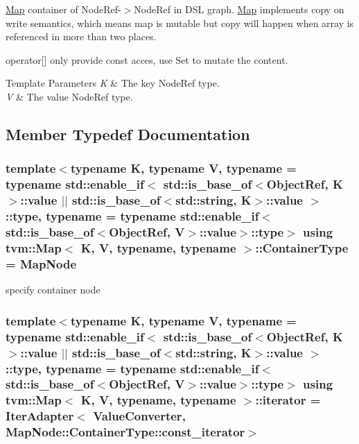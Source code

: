 \hyperlink{classtvm_1_1Map}{Map} container of Node\+Ref-\/$>$Node\+Ref in D\+SL graph. \hyperlink{classtvm_1_1Map}{Map} implements copy on write semantics, which means map is mutable but copy will happen when array is referenced in more than two places. 

operator\mbox{[}\mbox{]} only provide const acces, use Set to mutate the content. 
\begin{DoxyTemplParams}{Template Parameters}
{\em K} & The key Node\+Ref type. \\
\hline
{\em V} & The value Node\+Ref type. \\
\hline
\end{DoxyTemplParams}


\subsection{Member Typedef Documentation}
\subsubsection[{\texorpdfstring{Container\+Type}{ContainerType}}]{\setlength{\rightskip}{0pt plus 5cm}template$<$typename K, typename V, typename  = typename std\+::enable\+\_\+if$<$           std\+::is\+\_\+base\+\_\+of$<$\+Object\+Ref, K$>$\+::value $\vert$$\vert$           std\+::is\+\_\+base\+\_\+of$<$std\+::string, K$>$\+::value $>$\+::type, typename  = typename std\+::enable\+\_\+if$<$std\+::is\+\_\+base\+\_\+of$<$\+Object\+Ref, V$>$\+::value$>$\+::type$>$ using {\bf tvm\+::\+Map}$<$ K, V, typename, typename $>$\+::{\bf Container\+Type} =  {\bf Map\+Node}}\hypertarget{classtvm_1_1Map_a032205a9ae4e6f2d945837e7185b3d1a}{}\label{classtvm_1_1Map_a032205a9ae4e6f2d945837e7185b3d1a}


specify container node 

\subsubsection[{\texorpdfstring{iterator}{iterator}}]{\setlength{\rightskip}{0pt plus 5cm}template$<$typename K, typename V, typename  = typename std\+::enable\+\_\+if$<$           std\+::is\+\_\+base\+\_\+of$<$\+Object\+Ref, K$>$\+::value $\vert$$\vert$           std\+::is\+\_\+base\+\_\+of$<$std\+::string, K$>$\+::value $>$\+::type, typename  = typename std\+::enable\+\_\+if$<$std\+::is\+\_\+base\+\_\+of$<$\+Object\+Ref, V$>$\+::value$>$\+::type$>$ using {\bf tvm\+::\+Map}$<$ K, V, typename, typename $>$\+::{\bf iterator} =  {\bf Iter\+Adapter}$<$ {\bf Value\+Converter}, Map\+Node\+::\+Container\+Type\+::const\+\_\+iterator$>$}\hypertarget{classtvm_1_1Map_ac692b6c03df9de0b1d49f719bf659ee1}{}\label{classtvm_1_1Map_ac692b6c03df9de0b1d49f719bf659ee1}


